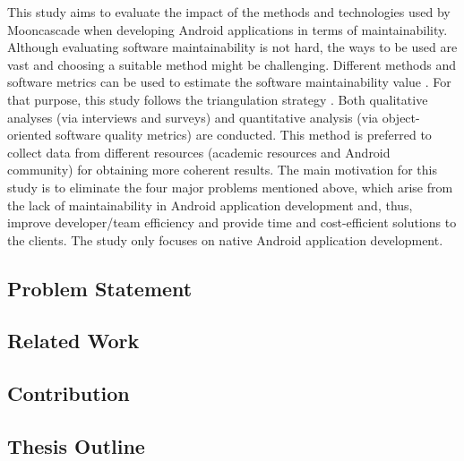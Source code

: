 This study aims to evaluate the impact of the methods and technologies used by Mooncascade when developing Android applications in terms of maintainability. Although evaluating software maintainability is not hard, the ways to be used are vast and choosing a suitable method might be challenging. Different methods and software metrics can be used to estimate the software maintainability value \cite{34,23,26,33,36,45}. For that purpose, this study follows the triangulation strategy \cite{51}. Both qualitative analyses (via interviews and surveys) and quantitative analysis (via object-oriented software quality metrics) are conducted. This method is preferred to collect data from different resources (academic resources and Android community) for obtaining more coherent results. The main motivation for this study is to eliminate the four major problems mentioned above, which arise from the lack of maintainability in Android application development and, thus, improve developer/team efficiency and provide time and cost-efficient solutions to the clients. The study only focuses on native Android application development.

\subsection{Problem Statement}
\label{section:1.1}


\subsection{Related Work}


\subsection{Contribution}


\subsection{Thesis Outline}
